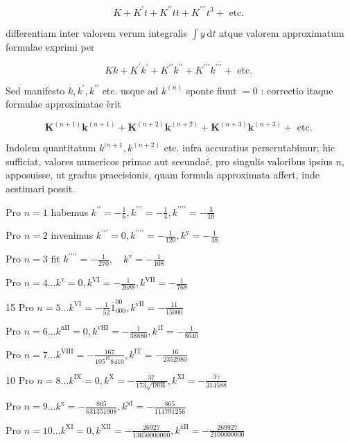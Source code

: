 \documentclass[10pt]{article}
\begin{document}
\[
K+K^{\prime} t+K^{\prime \prime} t t+K^{\prime \prime \prime} t^{3}+\text { etc. }
\]

differentiam inter valorem verum integralis \(\int y \mathrm{~d} t\) atque valorem approximatum formulae exprimi per

\[
K k+K^{\prime} k^{\prime}+K^{\prime \prime} k^{\prime \prime}+K^{\prime \prime \prime} k^{\prime \prime \prime}+\text { etc. }
\]

Sed manifesto \(k, k^{\prime}, k^{\prime \prime}\) etc. usque ad \(k^{(n)}\) sponte fiunt \(=0\) : correctio itaque formulae approximatae èrit

\[
\boldsymbol{K}^{(n+1)} \boldsymbol{k}^{(n+1)}+\boldsymbol{K}^{(n+2)} \boldsymbol{k}^{(n+2)}+\boldsymbol{K}^{(n+3)} \boldsymbol{k}^{(n+3)}+\text { etc. }
\]

Indolem quantitatum \(k^{(n+1}, k^{(n+2)}\) etc. infra accuratius perscrutabimur; hic sufficiat, valores numericos primae aut secundaé, pro singulis valoribus ipsius \(n\), apposuisse, ut gradus praecisionis, quam formula approximata affert, inde aestimari possit.

Pro \(n=1\) habemus \(k^{\prime \prime}=-\frac{1}{6}, k^{\prime \prime \prime}=-\frac{1}{4}, k^{\prime \prime \prime \prime}=-\frac{3}{10}\)

Pro \(n=2\) invenimus \(k^{\prime \prime \prime}=0, k^{\prime \prime \prime \prime}=-\frac{1}{120}, k^{\mathrm{v}}=-\frac{1}{48}\)

Pro \(n=3\) fit \(k^{\prime \prime \prime \prime}=-\frac{1}{270}, \quad k^{\mathrm{v}}=-\frac{1}{108}\)

Pro \(n=4 \ldots k^{\mathrm{v}}=0, k^{\mathrm{VI}}=-\frac{1}{2688}, k^{\mathrm{VII}}=-\frac{1}{768}\)

15 Pro \(n=5 \ldots k^{\mathrm{VI}}=-\frac{1}{52} \overline{1}_{000}^{00}, k^{\mathrm{vII}}=-\frac{11}{15000}\)

Pro \(n=6 \ldots k^{\mathrm{nII}}=0, k^{\mathrm{vHI}}=-\frac{1}{38880}, k^{1 \mathrm{I}}=-\frac{1}{8640}\)

Pro \(n=7 \ldots k^{\mathrm{VIII}}=-\frac{167}{105^{16} 8410}, k^{\mathrm{IT}}=-\frac{16}{2352980}\)

10 Pro \(n=8 \ldots k^{\mathrm{IX}}=0, k^{\mathrm{X}}=-\frac{37}{173 \sqrt{1804}}, k^{\mathrm{XI}}=-\frac{3 \gamma}{314588}\)

Pro \(n=9 \ldots k^{\mathrm{x}}=-\frac{865}{631351908}, k^{\mathrm{xI}}=-\frac{865}{114791256}\)

Pro \(n=10 \ldots k^{\mathrm{XI}}=0, k^{\mathrm{XII}}=-\frac{26927}{13650000000}, k^{\mathrm{xII}}=-\frac{269927}{2100000000}\)
\end{document}
